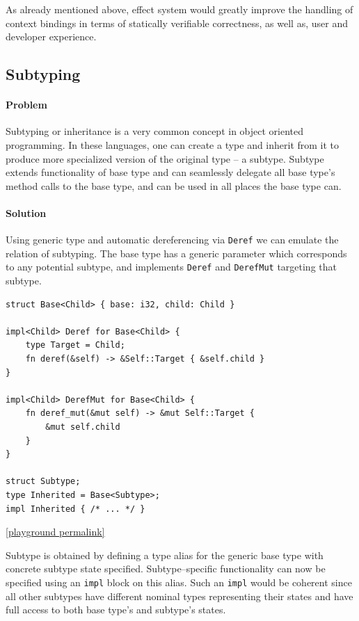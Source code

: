 As already mentioned above, effect system would greatly improve the handling of context bindings in terms of statically verifiable correctness, as well as, user and developer experience.

\subsection{Subtyping}

\paragraph{Problem}

Subtyping or inheritance is a very common concept in object oriented programming. 
In these languages, one can create a type and inherit from it to produce more specialized version of the original type -- a subtype.
Subtype extends functionality of base type and can seamlessly delegate all base type's method calls to the base type, and can be used in all places the base type can.

\paragraph{Solution}

Using generic type and automatic dereferencing via \texttt{Deref} we can emulate the relation of subtyping.
The base type has a generic parameter which corresponds to any potential subtype, and implements \texttt{Deref} and \texttt{DerefMut} targeting that subtype.

\begin{lstlisting}
struct Base<Child> { base: i32, child: Child }

impl<Child> Deref for Base<Child> {
    type Target = Child;
    fn deref(&self) -> &Self::Target { &self.child }
}

impl<Child> DerefMut for Base<Child> {
    fn deref_mut(&mut self) -> &mut Self::Target {
        &mut self.child
    }
}

struct Subtype;
type Inherited = Base<Subtype>;
impl Inherited { /* ... */ }
\end{lstlisting}

\noindent \href{https://play.rust-lang.org/?version=stable&mode=debug&edition=2021&gist=8946828515f1f87f388374b6bbc69bca}{[playground permalink]}

Subtype is obtained by defining a type alias for the generic base type with concrete subtype state specified.
Subtype--specific functionality can now be specified using an \texttt{impl} block on this alias.
Such an \texttt{impl} would be coherent since all other subtypes have different nominal types representing their states and have full access to both base type's and subtype's states.

